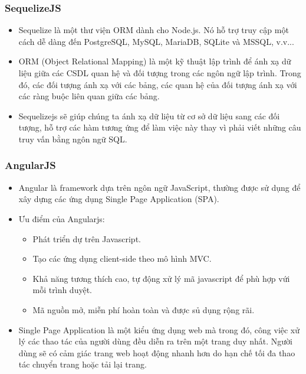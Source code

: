 \documentclass[a4paper,12pt,oneside]{article}
\begin{document}
\subsubsection{SequelizeJS \cite{sequelize}}
\begin{itemize}
\item Sequelize là một thư viện ORM dành cho Node.js. Nó hỗ trợ truy cập một cách dễ dàng đến PostgreSQL, MySQL, MariaDB, SQLite và MSSQL, v.v...
\item ORM (Object Relational Mapping) là một kỹ thuật lập trình để ánh xạ dữ liệu giữa các CSDL quan hệ và đối tượng trong các ngôn ngữ lập trình. Trong đó, các đối tượng ánh xạ với các bảng, các quan hệ của đối tượng ánh xạ với các ràng buộc liên quan giữa các bảng. \item Sequelizejs sẽ giúp chúng ta ánh xạ dữ liệu từ cơ sở dữ liệu sang các đối tượng, hỗ trợ các hàm tương ứng để làm việc này thay vì phải viết những câu truy vấn bằng ngôn ngữ SQL. 
\end{itemize}

\subsubsection{AngularJS \cite{angular}}
\begin{itemize}
\item Angular là framework dựa trên ngôn ngữ JavaScript, thường được sử dụng để xây dựng các ứng dụng Single Page Application (SPA).
\item Ưu điểm của Angularjs:
\begin{itemize}
	\item Phát triển dự trên Javascript.
	\item Tạo các ứng dụng client-side theo mô hình MVC.
	\item Khả năng tương thích cao, tự động xử lý mã javascript để phù hợp vứi mỗi trình duyệt.
	\item Mã nguồn mở, miễn phí hoàn toàn và được sủ dụng rộng rãi.
\end{itemize}
\item Single Page Application là một kiểu ứng dụng web mà trong đó, công việc xử lý các thao tác của người dùng đều diễn ra trên một trang duy nhất. Người dùng sẽ có cảm giác trang web hoạt động nhanh hơn do hạn chế tối đa thao tác chuyển trang hoặc tải lại trang.
\end{itemize}
\end{document}

